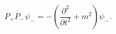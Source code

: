 \begin{equation}
\label{9}P_{+}P_{-}\psi _{-}=-\left( \frac{\partial ^2}{\partial t^2}%
+m^2\right) \psi _{-}. 
\end{equation}

